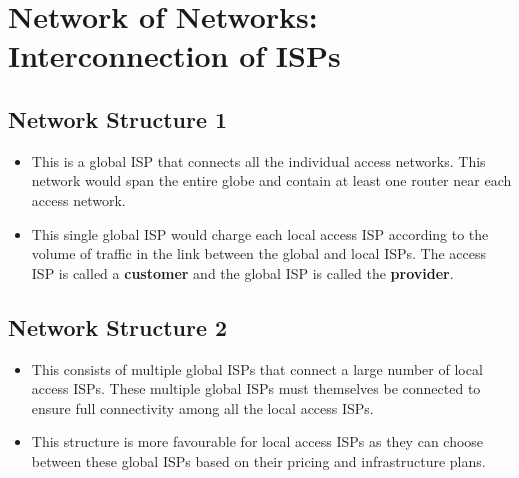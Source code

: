 \documentclass{article}
\theoremstyle{plain}
\theoremstyle{definition}
\begin{document}
\section{Network of Networks: Interconnection of ISPs}
\subsection{Network Structure 1} 
\begin{itemize}
    \item This is a global ISP that connects all the individual access networks. This network would span the entire globe and contain at least one router near each access network. 
    
    \item This single global ISP would charge each local access ISP according to the volume of traffic in the link between the global and local ISPs. The access ISP is called a \textbf{customer} and the global ISP is called the \textbf{provider}.
\end{itemize}
    
\subsection{Network Structure 2} 
\begin{itemize}
    \item 
    This consists of multiple global ISPs that connect a large number of local access ISPs. These multiple global ISPs must themselves be connected to ensure full connectivity among all the local access ISPs.
    
    \item This structure is more favourable for local access ISPs as they can choose between these global ISPs based on their pricing and infrastructure plans. 
\end{itemize}
\end{document}
